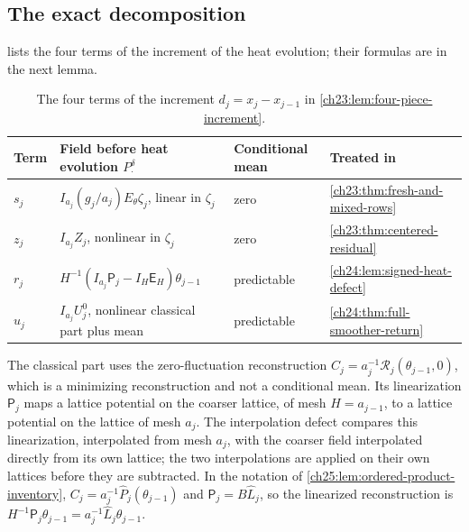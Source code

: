 \subsection{The exact decomposition}

 lists the four terms of the increment of the heat evolution; their formulas are in the next lemma.

\begin{table}[ht]
\centering
\small
\begin{tabular}{@{}llll@{}}
\toprule
Term & Field before heat evolution $P_\cdot^\delta$ & Conditional mean & Treated in\\
\midrule
$s_j$ & $I_{a_j}(g_j/a_j)E_\theta\zeta_j$, linear in $\zeta_j$ & zero & \cref{ch23:thm:fresh-and-mixed-rows}\\
$z_j$ & $I_{a_j}Z_j$, nonlinear in $\zeta_j$ & zero & \cref{ch23:thm:centered-residual}\\
$r_j$ & $H^{-1}(I_{a_j}\mathsf P_j-I_H\mathsf E_H)\theta_{j-1}$ & predictable & \cref{ch24:lem:signed-heat-defect}\\
$u_j$ & $I_{a_j}U_j^0$, nonlinear classical part plus mean & predictable & \cref{ch24:thm:full-smoother-return}\\
\bottomrule
\end{tabular}
\caption{The four terms of the increment $d_j=x_j-x_{j-1}$ in \cref{ch23:lem:four-piece-increment}.}
\label{ch23:tab:four-terms}
\end{table}

The classical part uses the zero-fluctuation reconstruction $C_j=a_j^{-1}\mathscr R_j(\theta_{j-1},0)$, which is a minimizing reconstruction and not a conditional mean. Its linearization $\mathsf P_j$ maps a lattice potential on the coarser lattice, of mesh $H=a_{j-1}$, to a lattice potential on the lattice of mesh $a_j$. The interpolation defect compares this linearization, interpolated from mesh $a_j$, with the coarser field interpolated directly from its own lattice; the two interpolations are applied on their own lattices before they are subtracted. In the notation of \cref{ch25:lem:ordered-product-inventory}, $C_j=a_j^{-1}\widehat P_j(\theta_{j-1})$ and $\mathsf P_j=B\widehat L_j$, so the linearized reconstruction is $H^{-1}\mathsf P_j\theta_{j-1}=a_j^{-1}\widehat L_j\theta_{j-1}$.

